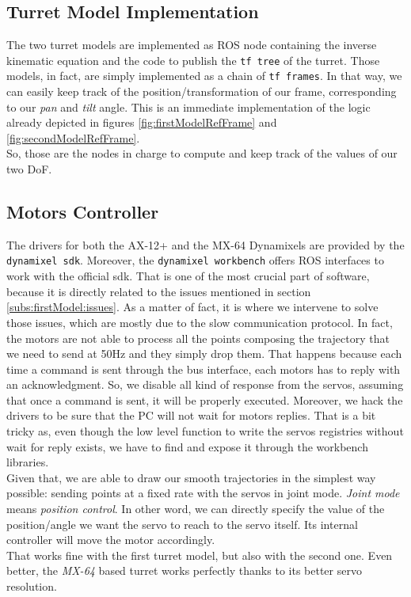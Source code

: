 \subsection{Turret Model Implementation}
The two turret models are implemented as \ac{ROS} node containing the inverse kinematic equation and the code to publish the \texttt{tf tree} of the turret. Those models, in fact, are simply implemented as a chain of \texttt{tf frames}. In that way, we can easily keep track of the position/transformation of our frame, corresponding to our \emph{pan} and \emph{tilt} angle. This is an immediate implementation of the logic already depicted in figures \ref{fig:firstModelRefFrame} and \ref{fig:secondModelRefFrame}.\\
So, those are the nodes in charge to compute and keep track of the values of our two \ac{DoF}.


\subsection{Motors Controller}
The drivers for both the AX-12+ and the MX-64 Dynamixels are provided by the \texttt{dynamixel sdk}. Moreover, the \texttt{dynamixel workbench} offers \ac{ROS} interfaces to work with the official sdk. That is one of the most crucial part of software, because it is directly related to the issues mentioned in section \ref{subs:firstModel:issues}. As a matter of fact, it is where we intervene to solve those issues, which are mostly due to the slow communication protocol. In fact, the motors are not able to process all the points composing the trajectory that we need to send at 50Hz and they simply drop them. That happens because each time a command is sent through the bus interface, each motors has to reply with an acknowledgment. So, we disable all kind of response from the servos, assuming that once a command is sent, it will be properly executed. Moreover, we hack the drivers to be sure that the PC will not wait for motors replies. That is a bit tricky as, even though the low level function to write the servos registries without wait for reply exists, we have to find and expose it through the workbench libraries.\\
Given that, we are able to draw our smooth trajectories in the simplest way possible: sending points at a fixed rate with the servos in joint mode. \emph{Joint mode} means \emph{position control}. In other word, we can directly specify the value of the position/angle we want the servo to reach to the servo itself. Its internal controller will move the motor accordingly.\\
That works fine with the first turret model, but also with the second one. Even better, the \emph{MX-64} based turret works perfectly thanks to its better servo resolution.\\

